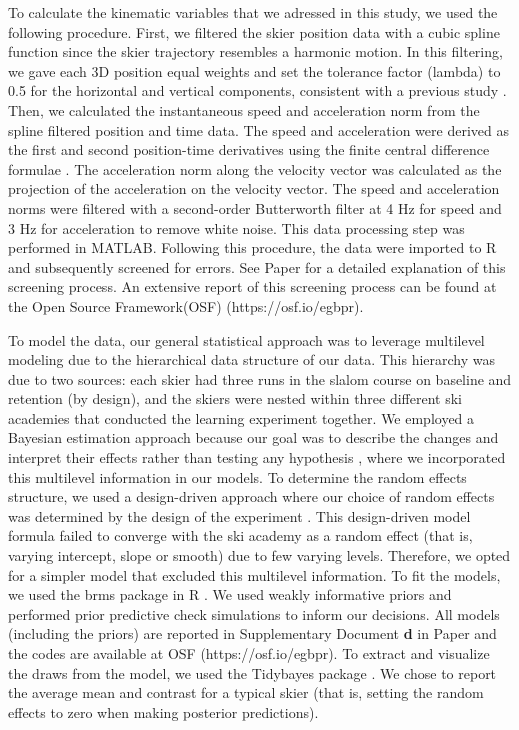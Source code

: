 To calculate the kinematic variables that we adressed in this study, we used the following procedure. First, we filtered the skier position data with a cubic spline function since the skier trajectory resembles a harmonic motion. In this filtering, we gave each 3D position equal weights and set the tolerance factor (lambda) to 0.5 for the horizontal and vertical components, consistent with a previous study \cite{gilgien_determination_2013}. Then, we calculated the instantaneous speed and acceleration norm from the spline filtered position and time data. The speed and acceleration were derived as the first and second position-time derivatives using the finite central difference formulae \cite{gilat_numerical_2013}. The acceleration norm along the velocity vector was calculated as the projection of the acceleration on the velocity vector. The speed and acceleration norms were filtered with a second-order Butterworth filter at 4 Hz for speed and 3 Hz for acceleration to remove white noise. This data processing step was performed in MATLAB. Following this procedure, the data were imported to R and subsequently screened for errors. See Paper  for a detailed explanation of this screening process. An extensive report of this screening process can be found at the Open Source Framework(OSF) (https://osf.io/egbpr). 

To model the data, our general statistical approach was to leverage multilevel modeling due to the hierarchical data structure of our data. This hierarchy was due to two sources: each skier had three runs in the slalom course on baseline and retention (by design), and the skiers were nested within three different ski academies that conducted the learning experiment together. We employed a Bayesian estimation approach because our goal was to describe the changes and interpret their effects rather than testing any hypothesis \cite{kruschke_bayesian_2018}, where we incorporated this multilevel information in our models. To determine the random effects structure, we used a design-driven approach where our choice of random effects was determined by the design of the experiment \cite{barr_learning_2021,barr_random_2013}. This design-driven model formula failed to converge with the ski academy as a random effect (that is, varying intercept, slope or smooth) due to few varying levels. Therefore, we opted for a simpler model that excluded this multilevel information. To fit the models, we used the brms \cite{burkner_brms_2017} package in R \cite{r_core_team_r_2022}. We used weakly informative priors and performed prior predictive check simulations to inform our decisions. All models (including the priors) are reported in Supplementary Document \textbf{d} in Paper  and the codes are available at OSF  (https://osf.io/egbpr). To extract and visualize the draws from the model, we used the Tidybayes package \cite{kay_tidybayes_nodate}. We chose to report the average mean and contrast for a typical skier (that is, setting the random effects to zero when making posterior predictions).

